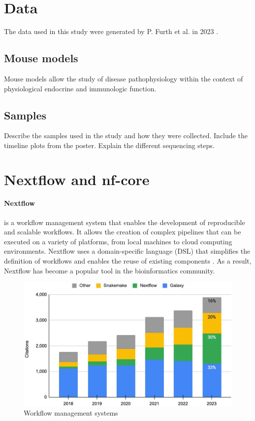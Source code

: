 \section{Data}
The data used in this study were generated by P. Furth et al. in 2023
\supercite{furth_esr1_2023,furth_overexpression_2023}.

\subsection{Mouse models}
Mouse models allow the study of disease pathophysiology within the context of
physiological endocrine and immunologic function.

\subsection{Samples}
Describe the samples used in the study and how they were collected.
Include the timeline plots from the poster.
Explain the different sequencing steps.

\section{Nextflow and nf-core}
\paragraph{Nextflow} is a workflow management system that enables the
development of reproducible and scalable workflows. It allows the creation of
complex pipelines that can be executed on a variety of platforms, from local
machines to cloud computing environments. Nextflow uses a domain-specific
language (DSL) that simplifies the definition of workflows and enables the reuse
of existing components \supercite{di_tommaso_nextflow_2017}. As a result,
Nextflow has become a popular tool in the bioinformatics community.

\begin{figure}[ht]
    \centering
    \includegraphics[width=\textwidth]{chapters/materials_and_methods/figures/nextflow_usage.jpg}
    \caption{Workflow management systems} %
    \label{fig:nextflow_usage}
\end{figure}

